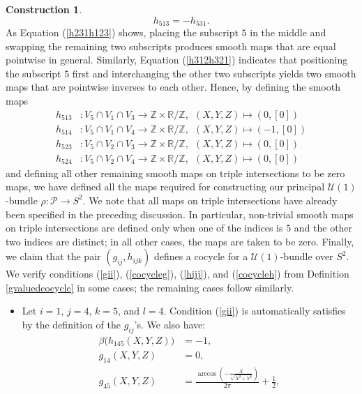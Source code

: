 \documentclass{article}
\theoremstyle{plain}
\theoremstyle{definition}
\newtheorem{const}[thm]{Construction}
\begin{document}
\begin{const}
\begin{equation}
h_{5 1 3} = - h_{5 3 1}.
\end{equation}
As Equation (\ref{h231h123}) shows, placing the subscript $5$ in the middle and swapping the remaining two subscripts produces smooth maps that are equal pointwise in general. Similarly, Equation (\ref{h312h321}) indicates that positioning the subscript $5$ first and interchanging the other two subscripts yields two smooth maps that are pointwise inverses to each other. Hence, by defining the smooth maps
\begin{align*}
h_{5 1 3} & : V_5 \cap V_1 \cap V_3 \longrightarrow \mathbb{Z} \times \mathbb{R}/\mathbb{Z}, ~~ (X,Y,Z) \mapsto \left(0,[0]\right) \\
h_{5 1 4} & : V_5 \cap V_1 \cap V_4 \longrightarrow \mathbb{Z} \times \mathbb{R}/\mathbb{Z}, ~~ (X,Y,Z) \mapsto \left(-1,[0]\right) \\
h_{5 2 3} & : V_5 \cap V_2 \cap V_3 \longrightarrow \mathbb{Z} \times \mathbb{R}/\mathbb{Z}, ~~ (X,Y,Z) \mapsto \left(0,[0]\right) \\
h_{5 2 4} & : V_5 \cap V_2 \cap V_4 \longrightarrow \mathbb{Z} \times \mathbb{R}/\mathbb{Z}, ~~ (X,Y,Z) \mapsto \left(0,[0]\right)
\end{align*}
and defining all other remaining smooth maps on triple intersections to be zero maps, we have defined all the maps required for constructing our principal $\mathcal{U}(1)$-bundle $\rho:\mathcal{P} \longrightarrow S^2$. We note that all maps on triple intersections have already been specified in the preceding discussion. In particular, non-trivial smooth maps on triple intersections are defined only when one of the indices is $5$ and the other two indices are distinct; in all other cases, the maps are taken to be zero. Finally, we claim that the pair $(g_{ij},h_{ijk})$ defines a cocycle for a $\mathcal{U}(1)$-bundle over $S^2$. We verify conditions (\ref{gii}), (\ref{cocycleg}), (\ref{hijj}), and (\ref{cocycleh}) from Definition \ref{gvaluedcocycle} in some cases; the remaining cases follow similarly.
\begin{itemize}
\item Let $i=1$, $j=4$, $k=5$, and $l=4$. Condition (\ref{gii}) is automatically satisfies by the definition of the $g_{ij}$'s. We also have:
\begin{align*}
\beta\Big(h_{145}(X,Y,Z)\Big) & = -1, \\
g_{14}(X,Y,Z) & = 0, \\
g_{45}(X,Y,Z) & = \frac{\arccos(-\frac{X}{\sqrt{X^2+Y^2}})}{2\pi} + \frac{1}{2}, \\

\end{align*}
\end{itemize}
\end{const}
\end{document}
